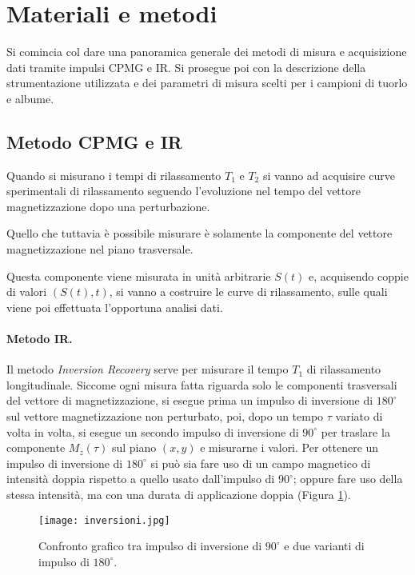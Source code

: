\section*{Materiali e metodi}

Si comincia col dare una panoramica generale dei metodi di misura e acquisizione dati tramite impulsi CPMG e IR. Si prosegue poi con la descrizione della strumentazione utilizzata e dei parametri di misura scelti per i campioni di tuorlo e albume.

\subsection*{Metodo CPMG e IR}

Quando si misurano i tempi di rilassamento $T_1$ e $T_2$ si vanno ad acquisire curve sperimentali di rilassamento seguendo l'evoluzione nel tempo del vettore magnetizzazione dopo una perturbazione.

Quello che tuttavia è possibile misurare è solamente la componente del vettore magnetizzazione nel piano trasversale.

Questa componente viene misurata in unità arbitrarie $S(t)$ e, acquisendo coppie di valori $(S(t), t)$, si vanno a costruire le curve di rilassamento, sulle quali viene poi effettuata l'opportuna analisi dati.

\paragraph{Metodo IR.}

Il metodo \textit{Inversion Recovery} serve per misurare il tempo $T_1$ di rilassamento longitudinale. Siccome ogni misura fatta riguarda solo le componenti trasversali del vettore di magnetizzazione, si esegue prima un impulso di inversione di $180^{\circ}$ sul vettore magnetizzazione non perturbato, poi, dopo un tempo $\tau$ variato di volta in volta, si esegue un secondo impulso di inversione di $90^{\circ}$ per traslare la componente $M_z(\tau)$ sul piano $(x,y)$ e misurarne i valori. Per ottenere un impulso di inversione di $180^{\circ}$ si può sia fare uso di un campo magnetico di intensità doppia rispetto a quello usato dall'impulso di $90^{\circ}$; oppure fare uso della stessa intensità, ma con una durata di applicazione doppia (Figura \ref{fig:inversioni}).

\begin{figure}[ht]
\centering
\texttt{[image: inversioni.jpg]}
\caption{Confronto grafico tra impulso di inversione di $90^{\circ}$ e due varianti di impulso di $180^{\circ}$.}
\label{fig:inversioni}
\end{figure}  

